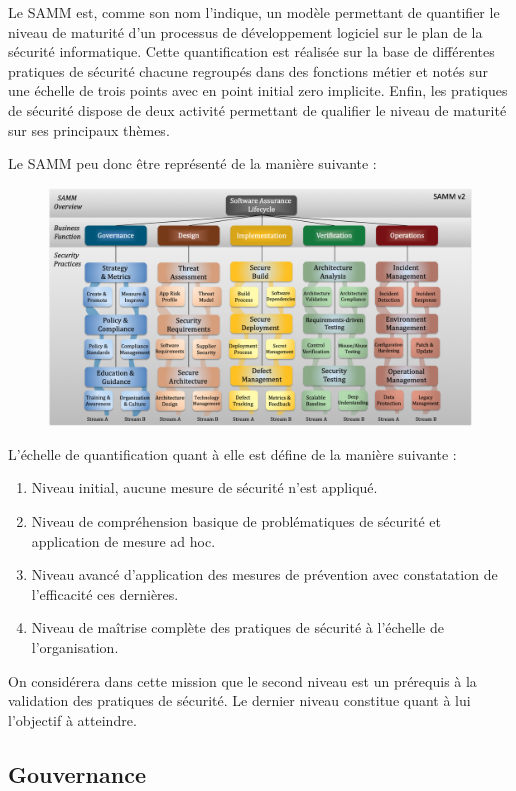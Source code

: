 Le \ac{SAMM} est, comme son nom l'indique, un modèle permettant de quantifier le niveau de maturité d'un processus de 
développement logiciel sur le plan de la sécurité informatique. Cette quantification est réalisée sur la base de différentes
pratiques de sécurité chacune regroupés dans des fonctions métier et notés sur une échelle de trois points avec en point 
initial zero implicite. Enfin, les pratiques de sécurité dispose de deux activité permettant de qualifier le niveau de 
maturité sur ses principaux thèmes.

Le \ac{SAMM} peu donc être représenté de la manière suivante :

\begin{figure}[h]
    \centering
    \includegraphics[width=1\linewidth]{resources/img/Samm_v2.png}
    \label{fig:samm-rep}
\end{figure}

\newpage

L'échelle de quantification quant à elle est défine de la manière suivante : 
\begin{enumerate}
    \item Niveau initial, aucune mesure de sécurité n'est appliqué.
    \item Niveau de compréhension basique de problématiques de sécurité et application de mesure ad hoc.
    \item Niveau avancé d'application des mesures de prévention avec constatation de l'efficacité ces dernières.
    \item Niveau de maîtrise complète des pratiques de sécurité à l'échelle de l'organisation.
\end{enumerate}
On considérera dans cette mission que le second niveau est un prérequis à la validation des pratiques de sécurité.
Le dernier niveau constitue quant à lui l'objectif à atteindre.

\subsection{Gouvernance}
